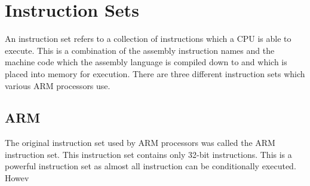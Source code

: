 \chapter{Instruction Sets}
An instruction set refers to a collection of instructions which a CPU is able to execute. This is a combination of the assembly instruction names and the machine code which the assembly language is compiled down to and which is placed into memory for execution. There are three different instruction sets which various ARM processors use.

\section{ARM}
The original instruction set used by ARM processors was called the ARM instruction set. This instruction set contains only 32-bit instructions. This is a powerful instruction set as almost all instruction can be conditionally executed. Howev
